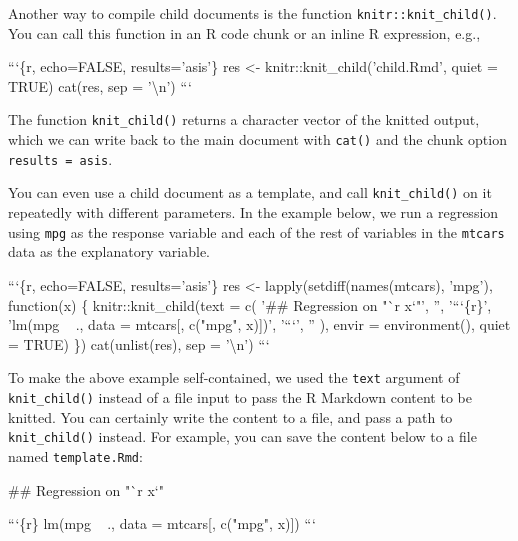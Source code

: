 \documentclass[
  11pt,
]{krantz}
\newenvironment{Shaded}{\begin{snugshade}}{\end{snugshade}}
\newcommand{\BaseNTok}[1]{\textcolor[rgb]{0.06,0.06,0.06}{#1}}
\newcommand{\FunctionTok}[1]{\textcolor[rgb]{0,0,0}{#1}}
\begin{document}
Another way to compile child documents is the function \texttt{knitr::knit\_child()}. You can call this function in an R code chunk or an inline R expression, e.g.,

\begin{Shaded}
\begin{Highlighting}[]
\BaseNTok{```\{r, echo=FALSE, results='asis'\}}
\BaseNTok{res <- knitr::knit_child('child.Rmd', quiet = TRUE)}
\BaseNTok{cat(res, sep = '\textbackslash{}n')}
\BaseNTok{```}
\end{Highlighting}
\end{Shaded}

The function \texttt{knit\_child()} returns a character vector of the knitted output, which we can write back to the main document with \texttt{cat()} and the chunk option \texttt{results\ =\ \textquotesingle{}asis\textquotesingle{}}.

You can even use a child document as a template, and call \texttt{knit\_child()} on it repeatedly with different parameters. In the example below, we run a regression using \texttt{mpg} as the response variable and each of the rest of variables in the \texttt{mtcars} data as the explanatory variable.

\begin{Shaded}
\begin{Highlighting}[]
\BaseNTok{```\{r, echo=FALSE, results='asis'\}}
\BaseNTok{res <- lapply(setdiff(names(mtcars), 'mpg'), function(x) \{}
\BaseNTok{  knitr::knit_child(text = c(}
\BaseNTok{    '## Regression on "`r x`"',}
\BaseNTok{    '',}
\BaseNTok{    '```\{r\}',}
\BaseNTok{    'lm(mpg ~ ., data = mtcars[, c("mpg", x)])',}
\BaseNTok{    '```',}
\BaseNTok{    ''}
\BaseNTok{  ), envir = environment(), quiet = TRUE)}
\BaseNTok{\})}
\BaseNTok{cat(unlist(res), sep = '\textbackslash{}n')}
\BaseNTok{```}
\end{Highlighting}
\end{Shaded}

To make the above example self-contained, we used the \texttt{text} argument of \texttt{knit\_child()} instead of a file input to pass the R Markdown content to be knitted. You can certainly write the content to a file, and pass a path to \texttt{knit\_child()} instead. For example, you can save the content below to a file named \texttt{template.Rmd}:

\begin{Shaded}
\begin{Highlighting}[]
\FunctionTok{## Regression on "`r x`"}

\BaseNTok{```\{r\}}
\BaseNTok{lm(mpg ~ ., data = mtcars[, c("mpg", x)])}
\BaseNTok{```}
\end{Highlighting}
\end{Shaded}
\end{document}
